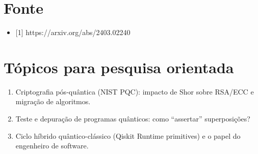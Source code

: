 \documentclass[
  brazilian,
]{report}
\providecommand{\tightlist}{%
  \setlength{\itemsep}{0pt}\setlength{\parskip}{0pt}}
\begin{document}
\section{Fonte}\label{fonte-2}

\begin{itemize}
\tightlist
\item
  {[}1{]} https://arxiv.org/abs/2403.02240
\end{itemize}

\section{Tópicos para pesquisa
orientada}\label{tuxf3picos-para-pesquisa-orientada}

\begin{enumerate}
\def\labelenumi{\arabic{enumi}.}
\tightlist
\item
  Criptografia pós-quântica (NIST PQC): impacto de Shor sobre RSA/ECC e
  migração de algoritmos.
\item
  Teste e depuração de programas quânticos: como ``assertar''
  superposições?
\item
  Ciclo híbrido quântico-clássico (Qiskit Runtime primitives) e o papel
  do engenheiro de software.
\end{enumerate}
\end{document}
